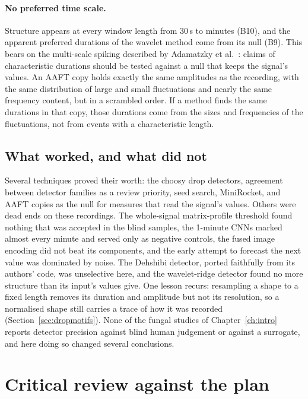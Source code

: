 \paragraph{No preferred time scale.} Structure appears at every window length from 30\,s to minutes (B10), and the apparent preferred durations of the wavelet method come from its null (B9). This bears on the multi-scale spiking described by Adamatzky et al.\ \cite{adamatzky2023}: claims of characteristic durations should be tested against a null that keeps the signal's values. An AAFT copy holds exactly the same amplitudes as the recording, with the same distribution of large and small fluctuations and nearly the same frequency content, but in a scrambled order. If a method finds the same durations in that copy, those durations come from the sizes and frequencies of the fluctuations, not from events with a characteristic length.

\subsection{What worked, and what did not}

Several techniques proved their worth: the choosy drop detectors, agreement between detector families as a review priority, seed search, MiniRocket, and AAFT copies as the null for measures that read the signal's values. Others were dead ends on these recordings. The whole-signal matrix-profile threshold found nothing that was accepted in the blind samples, the 1-minute CNNs marked almost every minute and served only as negative controls, the fused image encoding did not beat its components, and the early attempt to forecast the next value was dominated by noise. The Dehshibi detector, ported faithfully from its authors' code, was unselective here, and the wavelet-ridge detector found no more structure than its input's values give. One lesson recurs: resampling a shape to a fixed length removes its duration and amplitude but not its resolution, so a normalised shape still carries a trace of how it was recorded (Section~\ref{sec:dropmotifs}). None of the fungal studies of Chapter~\ref{ch:intro} reports detector precision against blind human judgement or against a surrogate, and here doing so changed several conclusions.

\section{Critical review against the plan}
\label{sec:review}

